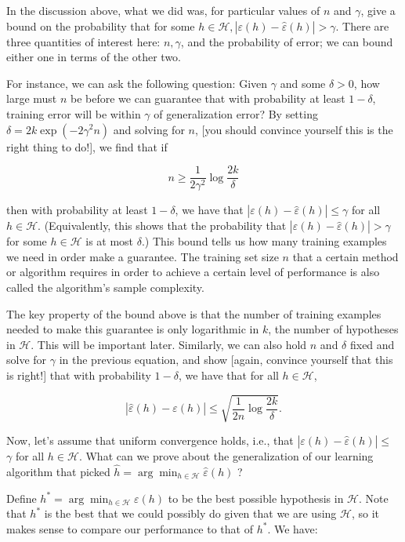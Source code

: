 \documentclass[10pt]{article}
\begin{document}
In the discussion above, what we did was, for particular values of \(n\) and \(\gamma\), give a bound on the probability that for some \(h \in \mathcal{H},|\varepsilon(h)-\hat{\varepsilon}(h)|>\gamma\). There are three quantities of interest here: \(n, \gamma\), and the probability of error; we can bound either one in terms of the other two.

For instance, we can ask the following question: Given \(\gamma\) and some \(\delta>0\), how large must \(n\) be before we can guarantee that with probability at least \(1-\delta\), training error will be within \(\gamma\) of generalization error? By setting \(\delta=2 k \exp \left(-2 \gamma^{2} n\right)\) and solving for \(n\), [you should convince yourself this is the right thing to do!], we find that if

\[
n \geq \frac{1}{2 \gamma^{2}} \log \frac{2 k}{\delta}
\]

then with probability at least \(1-\delta\), we have that \(|\varepsilon(h)-\hat{\varepsilon}(h)| \leq \gamma\) for all \(h \in \mathcal{H}\). (Equivalently, this shows that the probability that \(|\varepsilon(h)-\hat{\varepsilon}(h)|>\gamma\) for some \(h \in \mathcal{H}\) is at most \(\delta\).) This bound tells us how many training examples we need in order make a guarantee. The training set size \(n\) that a certain method or algorithm requires in order to achieve a certain level of performance is also called the algorithm's sample complexity.

The key property of the bound above is that the number of training examples needed to make this guarantee is only logarithmic in \(k\), the number of hypotheses in \(\mathcal{H}\). This will be important later. Similarly, we can also hold \(n\) and \(\delta\) fixed and solve for \(\gamma\) in the previous equation, and show [again, convince yourself that this is right!] that with probability \(1-\delta\), we have that for all \(h \in \mathcal{H}\),

\[
|\hat{\varepsilon}(h)-\varepsilon(h)| \leq \sqrt{\frac{1}{2 n} \log \frac{2 k}{\delta}} .
\]

Now, let's assume that uniform convergence holds, i.e., that \(|\varepsilon(h)-\hat{\varepsilon}(h)| \leq\) \(\gamma\) for all \(h \in \mathcal{H}\). What can we prove about the generalization of our learning algorithm that picked \(\hat{h}=\arg \min _{h \in \mathcal{H}} \hat{\varepsilon}(h)\) ?

Define \(h^{*}=\arg \min _{h \in \mathcal{H}} \varepsilon(h)\) to be the best possible hypothesis in \(\mathcal{H}\). Note that \(h^{*}\) is the best that we could possibly do given that we are using \(\mathcal{H}\), so it makes sense to compare our performance to that of \(h^{*}\). We have:
\end{document}
